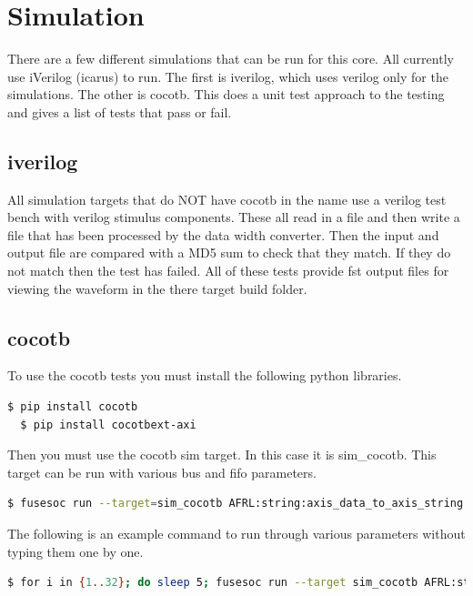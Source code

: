 \newpage

\section{Simulation}
\par
There are a few different simulations that can be run for this core. All currently use iVerilog (icarus) to run. The first is iverilog, which
uses verilog only for the simulations. The other is cocotb. This does a unit test approach to the testing and gives a list of tests that pass
or fail.

\subsection{iverilog}
\par
All simulation targets that do NOT have cocotb in the name use a verilog test bench with verilog stimulus components. These all read in a file
and then write a file that has been processed by the data width converter. Then the input and output file are compared with a MD5 sum to check that they
match. If they do not match then the test has failed. All of these tests provide fst output files for viewing the waveform in the there
target build folder.

\subsection{cocotb}
\par
To use the cocotb tests you must install the following python libraries.
\begin{lstlisting}[language=bash]
  $ pip install cocotb
  $ pip install cocotbext-axi
\end{lstlisting}

Then you must use the cocotb sim target. In this case it is sim\_cocotb. This target can be run with various bus and fifo parameters.
\begin{lstlisting}[language=bash]
  $ fusesoc run --target=sim_cocotb AFRL:string:axis_data_to_axis_string:1.0.0 --SBUS_WIDTH=4 --USER_WIDTH=8
\end{lstlisting}

The following is an example command to run through various parameters without typing them one by one.
\begin{lstlisting}[language=bash]
  $ for i in {1..32}; do sleep 5; fusesoc run --target sim_cocotb AFRL:string:axis_data_to_axis_string:1.0.0 --SBUS_WIDTH=$i ; echo "SLAVE WIDTH:" $i; done
\end{lstlisting}
\newpage

